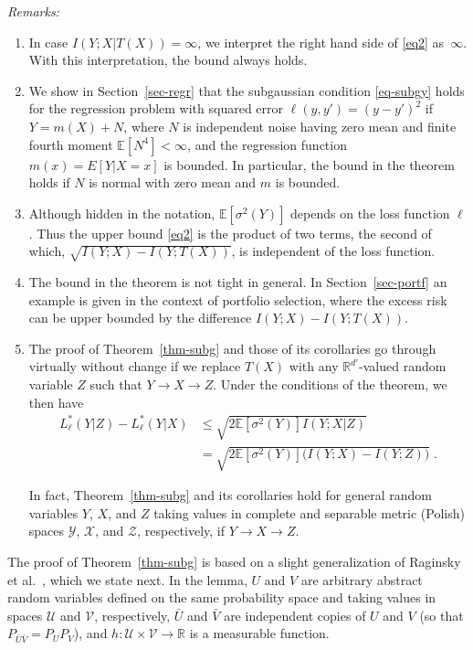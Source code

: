 \documentclass[11pt]{article}
\def\R{{\mathbb R}}
\def\U{\mathcal{U}}
\def\V{\mathcal{V}}
\def\EXP {{\mathbb E}}
\begin{document}
\noindent \emph{Remarks:} 
\vspace{-3pt}
\begin{enumerate}[label=(\roman*)]
\item
In case $I(Y;X|T(X)) =\infty$, we interpret the right hand side of \eqref{eq2} as~$\infty$. With this interpretation, the bound always holds. 

\item  We show in Section~\ref{sec-regr} that  the subgaussian
  condition \eqref{eq-subgy} holds for the regression problem with
  squared error $\ell(y,y')=(y-y')^2$ if  $Y=m(X)+N$, where  $N$   is
  independent noise having zero mean and finite fourth moment
  $\EXP[N^4]<\infty$, and the regression function $m(x)=E[Y|X=x]$ is
  bounded. In particular, the bound in the theorem holds if $N$ is
  normal with zero mean and $m$ is bounded.

\item Although hidden in the notation, $\EXP[\sigma^2(Y)]$ depends on the loss function $\ell$. Thus the upper bound \eqref{eq2}   is the product of two terms, the second of which, $\sqrt{ I(Y;X)-I(Y;T(X)) }$, is independent of the loss function. 

\item The bound in the theorem is not tight in general. In Section~\ref{sec-portf} an example is given in the context of portfolio selection, where the excess risk can be upper bounded by the difference $I(Y;X)-I(Y;T(X))$. 


\item
The proof of Theorem~\ref{thm-subg} and those of its
corollaries go  through virtually without
change if we replace $T(X)$ with  any $\R^{d'}$-valued random variable $Z$  such that
$Y\to X\to Z$.   Under the conditions of the theorem, we then have 
\begin{align*}  
 L_\ell^*(Y|Z) - L_\ell^*(Y|X)   
&\le    \sqrt{ 2\EXP[\sigma^2(Y)]I(Y;X|Z)  } \nonumber \\
& = \sqrt{2\EXP[\sigma^2(Y)]\big( I(Y;X)-I(Y;Z) \big)}\; .
\end{align*}

In fact,  Theorem~\ref{thm-subg} and its
corollaries  hold for general random variables $Y$, $X$, and $Z$ taking values in complete and separable metric (Polish) spaces $\mathcal{Y}$,  $\mathcal{X}$, and   $\mathcal{Z}$, respectively, if $Y\to X\to Z$.
\end{enumerate}


The proof of Theorem~\ref{thm-subg} is based on a slight generalization of  Raginsky et al.\ \cite[Lemma~10.2]{RaRaXu21},  which we state next. In the lemma,  $U$ and $V$ are arbitrary abstract random variables defined on the same probability space and taking values in spaces  $\U$ and $\V$, respectively,  $\bar{U}$ and $\bar{V}$ are independent copies of $U$ and $V$ (so that $P_{\bar{U}\bar{V}}= P_UP_V$), and $h:\U\times \V\to \R$ is a measurable function. 
\end{document}
